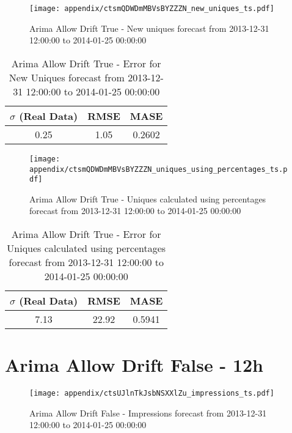 \begin{figure}[H] \begin{center} \leavevmode
\texttt{[image: appendix/ctsmQDWDmMBVsBYZZZN\_new\_uniques\_ts.pdf]} \caption{
Arima Allow Drift True - New uniques forecast from 2013-12-31 12:00:00 to 2014-01-25 00:00:00} \label{fig:appendix/ctsmQDWDmMBVsBYZZZN_new_uniques_ts.pdf} \end{center}
\end{figure}

\begin{table}[H]
\centering
\footnotesize
\begin{tabular}{ccc}
$\sigma$ (Real Data) & RMSE & MASE   \\ \hline
0.25 & 1.05 & 0.2602 \\
\end{tabular}

\vspace{0.5cm}

\caption{
Arima Allow Drift True - Error for New Uniques forecast from 2013-12-31 12:00:00 to 2014-01-25 00:00:00}
\end{table}

\begin{figure}[H] \begin{center} \leavevmode
\texttt{[image: appendix/ctsmQDWDmMBVsBYZZZN\_uniques\_using\_percentages\_ts.pdf]} \caption{
Arima Allow Drift True - Uniques calculated using percentages forecast from 2013-12-31 12:00:00 to 2014-01-25 00:00:00} \label{fig:appendix/ctsmQDWDmMBVsBYZZZN_uniques_using_percentages_ts.pdf} \end{center}
\end{figure}

\begin{table}[H]
\centering
\footnotesize
\begin{tabular}{ccc}
$\sigma$ (Real Data) & RMSE & MASE   \\ \hline
7.13 & 22.92 & 0.5941 \\
\end{tabular}

\vspace{0.5cm}

\caption{
Arima Allow Drift True - Error for Uniques calculated using percentages forecast from 2013-12-31 12:00:00 to 2014-01-25 00:00:00}
\end{table}

\section{Arima Allow Drift False - 12h}
\begin{figure}[H] \begin{center} \leavevmode
\texttt{[image: appendix/ctsUJlnTkJsbNSXXlZu\_impressions\_ts.pdf]} \caption{
Arima Allow Drift False - Impressions forecast from 2013-12-31 12:00:00 to 2014-01-25 00:00:00} \label{fig:appendix/ctsUJlnTkJsbNSXXlZu_impressions_ts.pdf} \end{center}
\end{figure}

